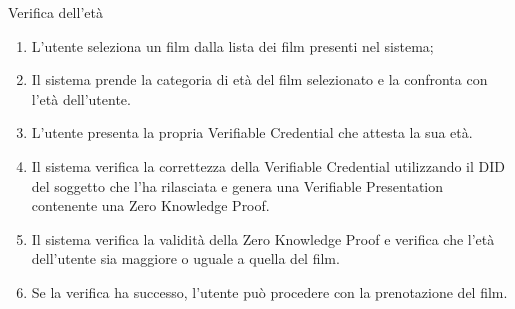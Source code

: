 \begin{usecase}{7}{Verifica dell'età}\label{uc:verifica-eta}
  \usecasemain{}
  
  \begin{enumerate}
    \item L'utente seleziona un film dalla lista dei film presenti nel sistema;
    \item Il sistema prende la categoria di età del film selezionato e la confronta con l'età dell'utente.
    \item L'utente presenta la propria Verifiable Credential che attesta la sua età.
    \item Il sistema verifica la correttezza della Verifiable Credential utilizzando il DID del soggetto che l'ha rilasciata e genera una Verifiable Presentation contenente una Zero Knowledge Proof.
    \item Il sistema verifica la validità della Zero Knowledge Proof e verifica che l'età dell'utente sia maggiore o uguale a quella del film.
    \item Se la verifica ha successo, l'utente può procedere con la prenotazione del film.
  \end{enumerate}
\end{usecase}

